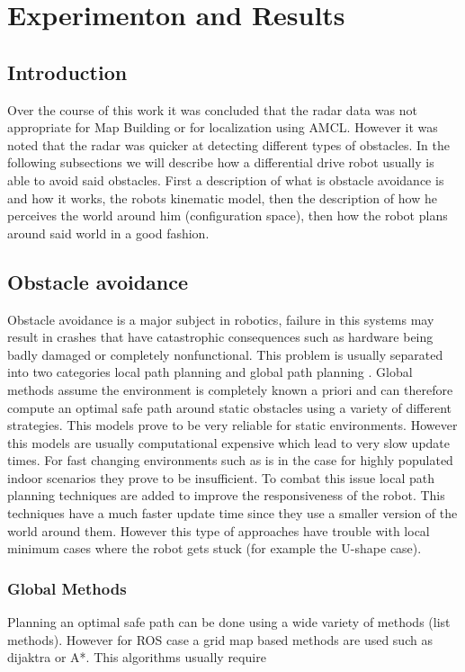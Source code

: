\chapter{Experimenton and Results}


\section{Introduction}
Over the course of this work it was concluded that the radar data was not appropriate for Map Building or for localization using \ac{AMCL}. However it was noted that the radar was quicker   at detecting different types of obstacles. In the following subsections we will describe how a differential drive robot usually is able to avoid  said obstacles. 
First a description of what is obstacle avoidance is and how it  works, the robots kinematic model, then the description of how he perceives the world around him (configuration space), then how the robot plans around said world in a good fashion.
\section{Obstacle avoidance}
 Obstacle avoidance is a major subject in robotics, failure in this systems may result in crashes that have catastrophic consequences such as hardware being badly damaged or completely nonfunctional. This problem is usually separated into two categories local path planning and global path planning \cite{}. 
 Global methods assume the environment is completely known a priori and can therefore compute an optimal safe path  around static obstacles using a variety of different strategies\cite{}. This models prove to be very reliable for static environments. However this models are usually computational expensive which lead to very slow update times. For fast changing environments such as is in the case for highly populated indoor scenarios they prove to be insufficient. 
 To combat this issue local path planning techniques are added to improve the responsiveness of the robot. This techniques have a much faster update time  since they use a smaller version of the world around them. However this type of approaches have trouble with local minimum cases where the robot gets stuck (for example the U-shape case).
\subsection{Global Methods}
Planning an optimal safe path can be done using a wide variety of methods (list methods). However for \ac{ROS} case a grid map based methods are used such as dijaktra or A*. This algorithms usually require 
